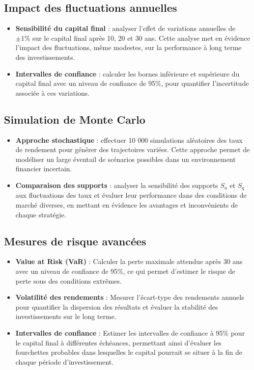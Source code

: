 \documentclass{article}
\begin{document}
\subsection{Impact des fluctuations annuelles}
\begin{itemize}
    \item \textbf{Sensibilité du capital final} :  
    analyser l'effet de variations annuelles de \( \pm 1\% \) sur le capital final après 10, 20 et 30 ans. Cette analyse met en évidence l'impact des fluctuations, même modestes, sur la performance à long terme des investissements.  
    \item \textbf{Intervalles de confiance} :  
    calculer les bornes inférieure et supérieure du capital final avec un niveau de confiance de 95\%, pour quantifier l'incertitude associée à ces variations.
\end{itemize}

\subsection{Simulation de Monte Carlo}
\begin{itemize}
    \item \textbf{Approche stochastique} :  
    effectuer 10 000 simulations aléatoires des taux de rendement pour générer des trajectoires variées. Cette approche permet de modéliser un large éventail de scénarios possibles dans un environnement financier incertain.  
    \item \textbf{Comparaison des supports} :  
    analyser la sensibilité des supports \( S_a \) et \( S_q \) aux fluctuations des taux et évaluer leur performance dans des conditions de marché diverses, en mettant en évidence les avantages et inconvénients de chaque stratégie.
\end{itemize}

\subsection{Mesures de risque avancées}
\begin{itemize}
    \item \textbf{Value at Risk (VaR)} :  
    Calculer la perte maximale attendue après 30 ans avec un niveau de confiance de 95\%, ce qui permet d’estimer le risque de perte sous des conditions extrêmes.  
    \item \textbf{Volatilité des rendements} :  
    Mesurer l'écart-type des rendements annuels pour quantifier la dispersion des résultats et évaluer la stabilité des investissements sur le long terme.  
    \item \textbf{Intervalles de confiance} :  
    Estimer les intervalles de confiance à 95\% pour le capital final à différentes échéances, permettant ainsi d’évaluer les fourchettes probables dans lesquelles le capital pourrait se situer à la fin de chaque période d'investissement.
\end{itemize}
\end{document}
